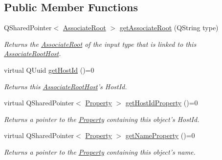 \subsection*{Public Member Functions}
\begin{DoxyCompactItemize}
\item 
\hypertarget{class_picto_1_1_associate_root_host_a87a31a985271beca4baacb262749d80e}{Q\-Shared\-Pointer$<$ \hyperlink{class_picto_1_1_associate_root}{Associate\-Root} $>$ \hyperlink{class_picto_1_1_associate_root_host_a87a31a985271beca4baacb262749d80e}{get\-Associate\-Root} (Q\-String type)}\label{class_picto_1_1_associate_root_host_a87a31a985271beca4baacb262749d80e}

\begin{DoxyCompactList}\small\item\em Returns the \hyperlink{class_picto_1_1_associate_root}{Associate\-Root} of the input type that is linked to this \hyperlink{class_picto_1_1_associate_root_host}{Associate\-Root\-Host}. \end{DoxyCompactList}\item 
virtual Q\-Uuid \hyperlink{class_picto_1_1_associate_root_host_a4663f4bd52ae67e5bdfbe46b3e7d1d9a}{get\-Host\-Id} ()=0
\begin{DoxyCompactList}\small\item\em Returns this \hyperlink{class_picto_1_1_associate_root_host}{Associate\-Root\-Host}'s Host\-Id. \end{DoxyCompactList}\item 
virtual Q\-Shared\-Pointer$<$ \hyperlink{class_picto_1_1_property}{Property} $>$ \hyperlink{class_picto_1_1_associate_root_host_a1c35bfa484ad0b31256f52634bd85926}{get\-Host\-Id\-Property} ()=0
\begin{DoxyCompactList}\small\item\em Returns a pointer to the \hyperlink{class_picto_1_1_property}{Property} containing this object's Host\-Id. \end{DoxyCompactList}\item 
virtual Q\-Shared\-Pointer$<$ \hyperlink{class_picto_1_1_property}{Property} $>$ \hyperlink{class_picto_1_1_associate_root_host_a856a87a22cfbd947f9fbf9d433338982}{get\-Name\-Property} ()=0
\begin{DoxyCompactList}\small\item\em Returns a pointer to the \hyperlink{class_picto_1_1_property}{Property} containing this object's name. \end{DoxyCompactList}\end{DoxyCompactItemize}
